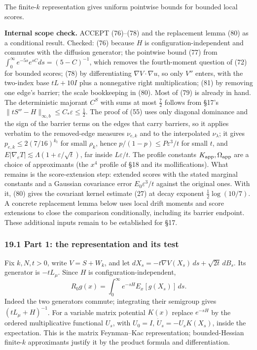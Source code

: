 \documentclass[11pt,a4paper]{article}
\begin{document}
The finite-\(k\) representation gives uniform pointwise bounds for
bounded local scores.

\textbf{Internal scope check.} ACCEPT (76)--(78) and the replacement
lemma (80) as a conditional result. Checked: (76) because \(H\) is
configuration-independent and commutes with the diffusion generator; the
pointwise bound (77) from \(\int_0^\infty e^{-5s}e^{sC}ds=(5-C)^{-1}\),
which removes the fourth-moment question of (72) for bounded scores;
(78) by differentiating \(\nabla V\cdot\nabla u\), so only \(V''\)
enters, with the two-index base \(tL+10I\) plus a nonnegative right
multiplication; (81) by removing one edge's barrier; the scale
bookkeeping in (80). Most of (79) is already in hand. The deterministic
majorant \(C^S\) with sums at most \(\frac72\) follows from §17's
\(\|tS''-H\|_{\infty,b}\le C_*\varepsilon\le\frac12\). The proof of (55)
uses only diagonal dominance and the sign of the barrier terms on the
edges that carry barriers, so it applies verbatim to the removed-edge
measures \(\nu_{e,k}\) and to the interpolated \(\nu_\lambda\); it gives
\(p_{e,k}\le2(7/16)^{k_t}\) for small \(\rho_k\), hence
\(p/(1-p)\le P\varepsilon^3/t\) for small \(t\), and
\(E|\nabla_eT|\lesssim\Lambda(1+\varepsilon/\sqrt t)\), far inside
\(L\varepsilon/t\). The profile constants
\(K_{\rm app},\Omega_{\rm app}\) are a choice of approximants (the
\(x^4\) profile of §18 and its mollifications). What remains is the
score-extension step: extended scores with the stated marginal constants
and a Gaussian covariance error \(E_0\varepsilon^3/t\) against the
original ones. With it, (80) gives the covariant kernel estimate (27) at
decay exponent \(\frac12\log(10/7)\). A concrete replacement lemma below
uses local drift moments and score extensions to close the comparison
conditionally, including its barrier endpoint. These additional inputs
remain to be established for §17.

\hypertarget{part-1-the-representation-and-its-test}{%
\subsubsection{19.1 Part 1: the representation and its
test}\label{part-1-the-representation-and-its-test}}

Fix \(k,N,t>0\), write \(V=S+W_k\), and let
\(dX_s=-t\nabla V(X_s)\,ds+\sqrt{2t}\,dB_s\). Its generator is
\(-tL_\mu\). Since \(H\) is configuration-independent,
\[R_0g(x)=\int_0^\infty e^{-sH}E_x[g(X_s)]\,ds.\tag{76}\] Indeed the two
generators commute; integrating their semigroup gives
\((tL_\mu+H)^{-1}\). For a variable matrix potential \(K(x)\) replace
\(e^{-sH}\) by the ordered multiplicative functional \(U_s\), with
\(U_0=I\), \(\dot U_s=-U_sK(X_s)\), inside the expectation. This is the
matrix Feynman--Kac representation; bounded-Hessian finite-\(k\)
approximants justify it by the product formula and differentiation.
\end{document}
